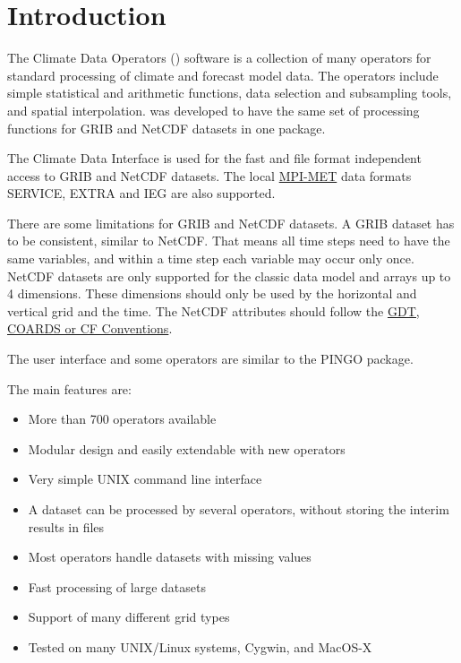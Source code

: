 \chapter{Introduction}

The Climate Data Operators ({\CDO}) software is a collection of many operators
for standard processing of climate and forecast model data.
The operators include simple statistical and arithmetic functions, data selection
and subsampling tools, and spatial interpolation.
{\CDO} was developed to have the same set of processing functions for GRIB \cite{GRIB} and NetCDF \cite{NetCDF}
datasets in one package.

The Climate Data Interface \cite{CDI} is used for the fast and file format
independent access to GRIB and NetCDF datasets.
The local \href{http://www.mpimet.mpg.de/}{MPI-MET} data formats SERVICE, EXTRA and 
IEG are also supported.

There are some limitations for GRIB and NetCDF datasets.
A GRIB dataset has to be consistent, similar to NetCDF.
That means all time steps need to have the same variables, and
within a time step each variable may occur only once.
NetCDF datasets are only supported for the classic data model and arrays up to 4 dimensions.
These dimensions should only be used by the horizontal and vertical grid and the time.
The NetCDF attributes should follow the
\href{https://www.unidata.ucar.edu/software/netcdf/conventions.html}
     {GDT, COARDS or CF Conventions}.

The user interface and some operators are similar to the PINGO \cite{PINGO} package.

The main {\CDO} features are:
\begin{itemize}
\item More than 700 operators available
\item Modular design and easily extendable with new operators
\item Very simple UNIX command line interface
\item A dataset can be processed by several operators,
      without storing the interim results in files %
\item Most operators handle datasets with missing values
\item Fast processing of large datasets
\item Support of many different grid types
\item Tested on many UNIX/Linux systems, Cygwin, and MacOS-X
\end{itemize}
















